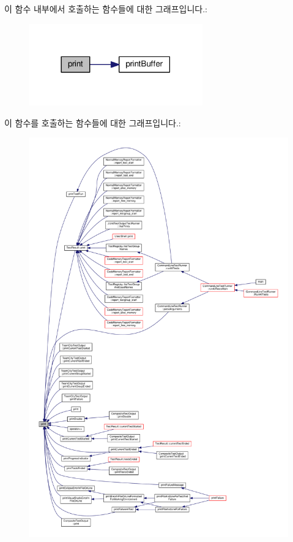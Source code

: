 이 함수 내부에서 호출하는 함수들에 대한 그래프입니다.\+:
\nopagebreak
\begin{figure}[H]
\begin{center}
\leavevmode
\includegraphics[width=213pt]{class_test_output_a321b5c489a90374cb61c34fe5d2253ef_cgraph}
\end{center}
\end{figure}




이 함수를 호출하는 함수들에 대한 그래프입니다.\+:
\nopagebreak
\begin{figure}[H]
\begin{center}
\leavevmode
\includegraphics[width=350pt]{class_test_output_a321b5c489a90374cb61c34fe5d2253ef_icgraph}
\end{center}
\end{figure}


